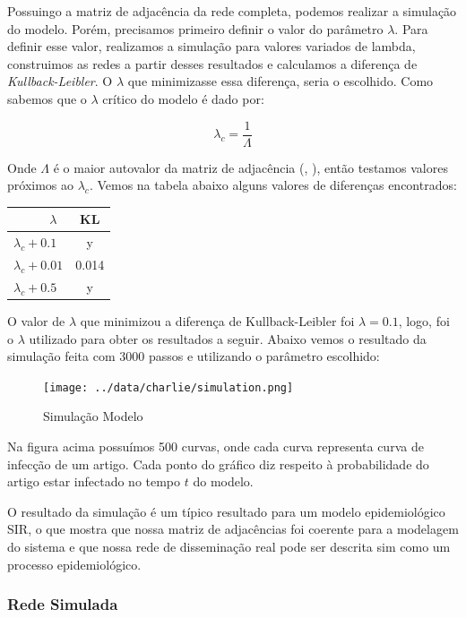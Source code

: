 \documentclass[a4paper,12pt]{article}
\begin{document}
Possuingo a matriz de adjacência da rede completa, podemos realizar a simulação do modelo. Porém, precisamos primeiro definir o valor do 
parâmetro $\lambda$. Para definir esse valor, realizamos a simulação para valores variados de lambda, construimos as redes a partir desses
resultados e calculamos a diferença de \textit{Kullback-Leibler}. O $\lambda$ que minimizasse essa diferença, seria o escolhido. Como sabemos
que o $\lambda$ crítico do modelo é dado por:

$$\lambda_{c} = \dfrac{1}{\Lambda}$$

Onde $\Lambda$ é o maior autovalor da matriz de adjacência (\cite{wang2003proceedings}, \cite{chakrabarti2008epidemic}), então testamos
valores próximos ao $\lambda_{c}$. Vemos na tabela
abaixo alguns valores de diferenças encontrados:

\begin{center}
 \begin{tabular}{l|c}
   \ \ \ \ \ $\lambda$ & KL \\ \hline
   $\lambda_{c} + 0.1$ & y\\
   $\lambda_{c} + 0.01$ & 0.014 \\
   $\lambda_{c} + 0.5$ & y
 \end{tabular}
\end{center}

O valor de $\lambda$ que minimizou a diferença de Kullback-Leibler foi $\lambda=0.1$, logo, foi o $\lambda$ utilizado para obter os
resultados a seguir. Abaixo vemos o resultado da simulação feita com 3000 passos e utilizando o parâmetro escolhido:

\begin{figure}[ht]
 \centering
 \texttt{[image: ../data/charlie/simulation.png]}
 \caption{Simulação Modelo}
\end{figure}

Na figura acima possuímos 500 curvas, onde cada curva representa curva de infecção de um artigo. Cada ponto do gráfico diz
respeito à probabilidade do artigo estar infectado no tempo $t$ do modelo. 

O resultado da simulação é um típico resultado para um modelo epidemiológico SIR, o que mostra que nossa matriz de adjacências foi coerente
para a modelagem do sistema e que nossa rede de disseminação real pode ser descrita sim como um processo epidemiológico.

\subsubsection{Rede Simulada}
\end{document}
